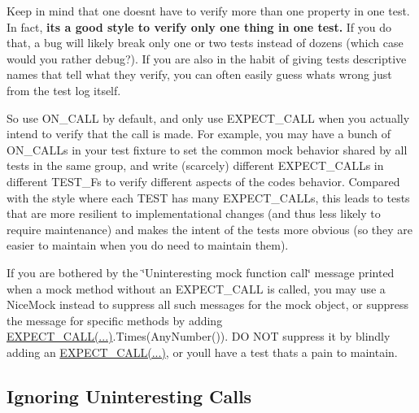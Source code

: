 Keep in mind that one doesn\textquotesingle{}t have to verify more than one property in one test. In fact, {\bfseries{it\textquotesingle{}s a good style to verify only one thing in one test.}} If you do that, a bug will likely break only one or two tests instead of dozens (which case would you rather debug?). If you are also in the habit of giving tests descriptive names that tell what they verify, you can often easily guess what\textquotesingle{}s wrong just from the test log itself.

So use {\ttfamily O\+N\+\_\+\+C\+A\+LL} by default, and only use {\ttfamily E\+X\+P\+E\+C\+T\+\_\+\+C\+A\+LL} when you actually intend to verify that the call is made. For example, you may have a bunch of {\ttfamily O\+N\+\_\+\+C\+A\+LL}s in your test fixture to set the common mock behavior shared by all tests in the same group, and write (scarcely) different {\ttfamily E\+X\+P\+E\+C\+T\+\_\+\+C\+A\+LL}s in different {\ttfamily T\+E\+S\+T\+\_\+F}s to verify different aspects of the code\textquotesingle{}s behavior. Compared with the style where each {\ttfamily T\+E\+ST} has many {\ttfamily E\+X\+P\+E\+C\+T\+\_\+\+C\+A\+LL}s, this leads to tests that are more resilient to implementational changes (and thus less likely to require maintenance) and makes the intent of the tests more obvious (so they are easier to maintain when you do need to maintain them).

If you are bothered by the \char`\"{}\+Uninteresting mock function call\char`\"{} message printed when a mock method without an {\ttfamily E\+X\+P\+E\+C\+T\+\_\+\+C\+A\+LL} is called, you may use a {\ttfamily Nice\+Mock} instead to suppress all such messages for the mock object, or suppress the message for specific methods by adding {\ttfamily \mbox{\hyperlink{_obj__test_2lib_2googletest-release-1_88_81_2googlemock_2include_2gmock_2gmock-spec-builders_8h_a535a6156de72c1a2e25a127e38ee5232}{E\+X\+P\+E\+C\+T\+\_\+\+C\+A\+L\+L(...)}}.Times(\+Any\+Number())}. DO N\+OT suppress it by blindly adding an {\ttfamily \mbox{\hyperlink{_obj__test_2lib_2googletest-release-1_88_81_2googlemock_2include_2gmock_2gmock-spec-builders_8h_a535a6156de72c1a2e25a127e38ee5232}{E\+X\+P\+E\+C\+T\+\_\+\+C\+A\+L\+L(...)}}}, or you\textquotesingle{}ll have a test that\textquotesingle{}s a pain to maintain.

\subsection*{Ignoring Uninteresting Calls}

